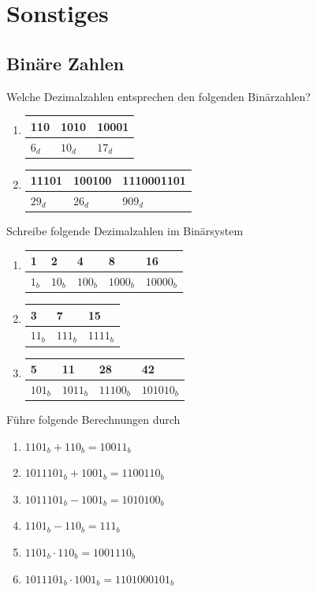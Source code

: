 \documentclass[11pt, a4paper]{article}
\begin{document}
\newpage
\section{Sonstiges}
\subsection{Binäre Zahlen}
Welche Dezimalzahlen entsprechen den folgenden Binärzahlen?
\begin{enumerate}
	\item
		\begin{tabular}{l|l|l}
			110 & 1010 & 10001 \\ \hline
			$6_d$ & $10_d$ & $17_d$
		\end{tabular}
	\item
		\begin{tabular}{l|l|l}
			11101 & 100100 & 1110001101 \\ \hline
			$29_d$ & $26_d$ & $909_d$
		\end{tabular}
\end{enumerate}
Schreibe folgende Dezimalzahlen im Binärsystem
\begin{enumerate}
	\item
		\begin{tabular}{l|l|l|l|l}
			1 & 2 & 4 & 8 & 16 \\ \hline
			$1_b$ & $10_b$ & $100_b$ & $1000_b$ & $10000_b$
		\end{tabular}
	\item
		\begin{tabular}{l|l|l}
			3 & 7 & 15 \\ \hline
			$11_b$ & $111_b$ & $1111_b$
		\end{tabular}
	\item
		\begin{tabular}{l|l|l|l}
			5 & 11 & 28 & 42\\ \hline
			$101_b$ & $1011_b$ & $11100_b$ & $101010_b$
		\end{tabular}
\end{enumerate}
Führe folgende Berechnungen durch
\begin{enumerate}
	\item $1101_b + 110_b = 10011_b$
	\item $1011101_b + 1001_b = 1100110_b$
	\item $1011101_b - 1001_b = 1010100_b$
	\item $1101_b - 110_b = 111_b$
	\item $1101_b \cdot 110_b = 1001110_b$
	\item $1011101_b \cdot 1001_b = 1101000101_b$
\end{enumerate}
\end{document}
